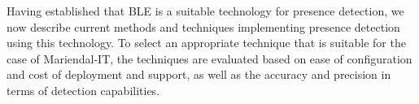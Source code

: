 Having established that BLE is a suitable technology for presence detection, we now describe current methods and techniques implementing presence detection using this technology.
To select an appropriate technique that is suitable for the case of Mariendal-IT, the techniques are evaluated based on ease of configuration and cost of deployment and support, as well as the accuracy and precision in terms of detection capabilities.


